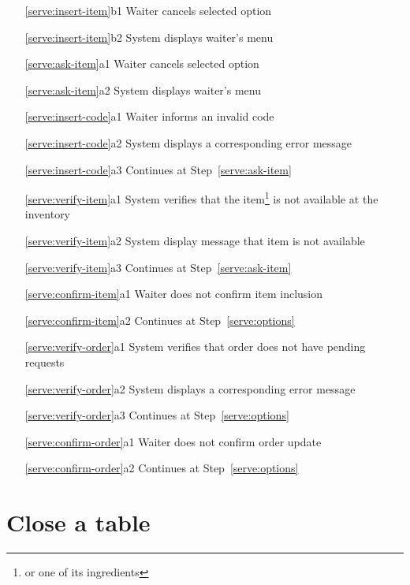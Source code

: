 \documentclass[a4paper,11pt,oneside]{book}
\newcommand{\cancel}[1]{#1 cancels selected option}
\newcommand{\menu}[1]{System displays #1's menu}
\newcommand{\goto}[1]{Continues at Step~\ref{#1}}
\begin{document}
\begin{enumerate}
  \item [\ref{serve:insert-item}b1] \cancel{Waiter}
  \item [\ref{serve:insert-item}b2] \menu{waiter}
    \\
  \item [\ref{serve:ask-item}a1] \cancel{Waiter}
  \item [\ref{serve:ask-item}a2] \menu{waiter}
    \\
  \item [\ref{serve:insert-code}a1] Waiter informs an invalid code
  \item [\ref{serve:insert-code}a2] System displays a corresponding error message
  \item [\ref{serve:insert-code}a3] \goto{serve:ask-item}
    \\
  \item [\ref{serve:verify-item}a1] System verifies that the item\footnote{or one of its ingredients} is not available at the inventory
  \item [\ref{serve:verify-item}a2] System display message that item is not available
  \item [\ref{serve:verify-item}a3] \goto{serve:ask-item}
    \\
  \item [\ref{serve:confirm-item}a1] Waiter does not confirm item inclusion
  \item [\ref{serve:confirm-item}a2] \goto{serve:options}
    \\
  \item [\ref{serve:verify-order}a1] System verifies that order does not have pending requests
  \item [\ref{serve:verify-order}a2] System displays a corresponding error message
  \item [\ref{serve:verify-order}a3] \goto{serve:options}
    \\
  \item [\ref{serve:confirm-order}a1] Waiter does not confirm order update
  \item [\ref{serve:confirm-order}a2] \goto{serve:options}
\end{enumerate}

\chapter{Close a table}
\end{document}
